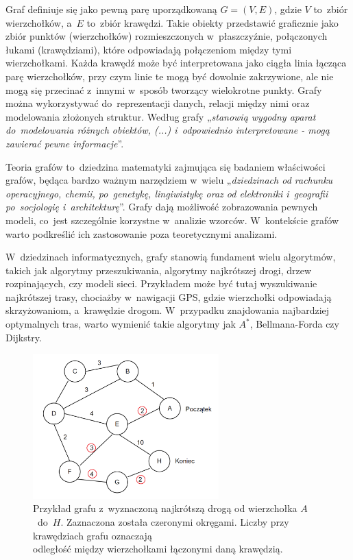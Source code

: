 Graf definiuje się jako pewną parę uporządkowaną $G = (V, E)$, gdzie $V$ to~zbiór wierzchołków,
a~$E$ to~zbiór krawędzi.
Takie obiekty przedstawić graficznie jako zbiór punktów (wierzchołków) rozmieszczonych w~płaszczyźnie,
połączonych łukami (krawędziami), które odpowiadają połączeniom między tymi wierzchołkami.
Każda krawędź może być interpretowana jako ciągła linia łącząca parę wierzchołków,
przy czym linie te mogą być dowolnie zakrzywione,
ale nie mogą się przecinać z~innymi w~sposób tworzący wielokrotne punkty.
Grafy można wykorzystywać do~reprezentacji danych, relacji między nimi oraz modelowania złożonych struktur.
Według \cite{Wloch2008} grafy „\textit{stanowią wygodny aparat do~modelowania różnych obiektów, (...) i~odpowiednio interpretowane
- mogą zawierać pewne informacje}”.

Teoria grafów to~dziedzina matematyki zajmująca się badaniem właściwości grafów,
będąca bardzo ważnym narzędziem w~wielu „\textit{dziedzinach od rachunku operacyjnego, chemii, po~genetykę, lingiwistykę
oraz od elektroniki i~geografii po~socjologię i~architekturę}”\cite{Wilson2012}.
Grafy dają możliwość zobrazowania pewnych modeli, co~jest szczególnie korzystne w~analizie wzorców.
W~kontekście grafów warto podkreślić ich zastosowanie poza teoretycznymi analizami.

W~dziedzinach informatycznych, grafy stanowią fundament wielu algorytmów, takich jak algorytmy przeszukiwania,
algorytmy najkrótszej drogi, drzew rozpinających, czy modeli sieci.
Przykładem może być tutaj wyszukiwanie najkrótszej trasy, chociażby w~nawigacji GPS,
gdzie wierzchołki odpowiadają skrzyżowaniom, a~krawędzie drogom.
W~przypadku znajdowania najbardziej optymalnych tras, warto wymienić takie algorytmy jak $A^*$, Bellmana-Forda czy Dijkstry.

\begin{figure}[ht]
	\centering
	\includegraphics[height=5.6cm]{resources/introduction/images/shortest_path.png}
	\caption{Przykład grafu z~wyznaczoną najkrótszą drogą od wierzchołka $A$~do~$H$.
		Zaznaczona została czeronymi okręgami.
		Liczby przy krawędziach grafu oznaczają \\ odległość między wierzchołkami łączonymi daną krawędzią.}
    \label{Fig:intro-1}
\end{figure}
\FloatBarrier

